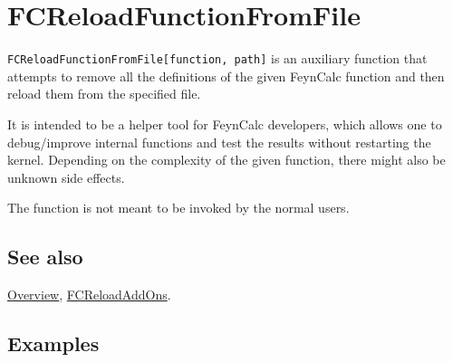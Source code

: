 \documentclass[../FeynCalcManual.tex]{subfiles}
\begin{document}
\hypertarget{fcreloadfunctionfromfile}{%
\section{FCReloadFunctionFromFile}\label{fcreloadfunctionfromfile}}

\texttt{FCReloadFunctionFromFile[\allowbreak{}function,\ \allowbreak{}path]}
is an auxiliary function that attempts to remove all the definitions of
the given FeynCalc function and then reload them from the specified
file.

It is intended to be a helper tool for FeynCalc developers, which allows
one to debug/improve internal functions and test the results without
restarting the kernel. Depending on the complexity of the given
function, there might also be unknown side effects.

The function is not meant to be invoked by the normal users.

\subsection{See also}

\hyperlink{toc}{Overview}, \hyperlink{fcreloadaddons}{FCReloadAddOns}.

\subsection{Examples}
\end{document}
